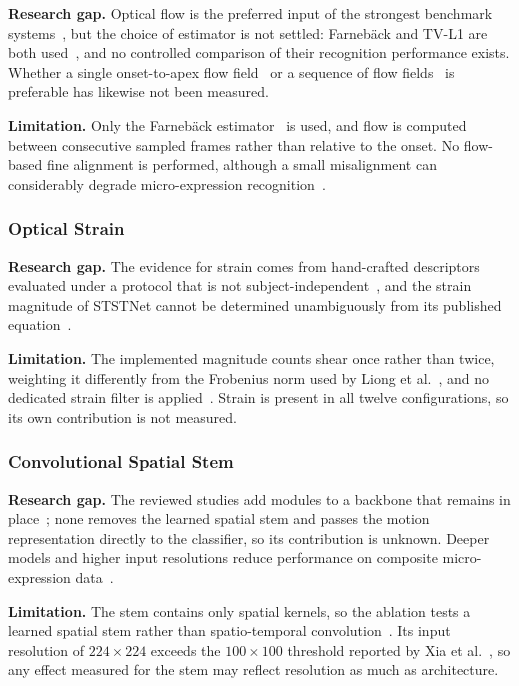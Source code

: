 \textbf{Research gap.} Optical flow is the preferred input of the strongest benchmark systems~\cite{see2019}, but the choice of estimator is not settled: Farneb\"ack and TV-L1 are both used~\cite{zhaoS2021,liong2019a}, and no controlled comparison of their recognition performance exists. Whether a single onset-to-apex flow field~\cite{liong2019a,liong2019b} or a sequence of flow fields~\cite{zhaoS2021} is preferable has likewise not been measured.

\textbf{Limitation.} Only the Farneb\"ack estimator~\cite{farneback2003} is used, and flow is computed between consecutive sampled frames rather than relative to the onset. No flow-based fine alignment is performed, although a small misalignment can considerably degrade micro-expression recognition~\cite{xu2017}.

\subsubsection{Optical Strain}

\textbf{Research gap.} The evidence for strain comes from hand-crafted descriptors evaluated under a protocol that is not subject-independent~\cite{liong2016}, and the strain magnitude of STSTNet cannot be determined unambiguously from its published equation~\cite{liong2019b}.

\textbf{Limitation.} The implemented magnitude counts shear once rather than twice, weighting it differently from the Frobenius norm used by Liong et al.~\cite{liong2014a,liong2016}, and no dedicated strain filter is applied~\cite{liong2014a}. Strain is present in all twelve configurations, so its own contribution is not measured.

\subsubsection{Convolutional Spatial Stem}

\textbf{Research gap.} The reviewed studies add modules to a backbone that remains in place~\cite{xia2020b}; none removes the learned spatial stem and passes the motion representation directly to the classifier, so its contribution is unknown. Deeper models and higher input resolutions reduce performance on composite micro-expression data~\cite{xia2020b}.

\textbf{Limitation.} The stem contains only spatial kernels, so the ablation tests a learned spatial stem rather than spatio-temporal convolution~\cite{ji2013,tran2015}. Its input resolution of $224\times224$ exceeds the $100\times100$ threshold reported by Xia et al.~\cite{xia2020b}, so any effect measured for the stem may reflect resolution as much as architecture.


